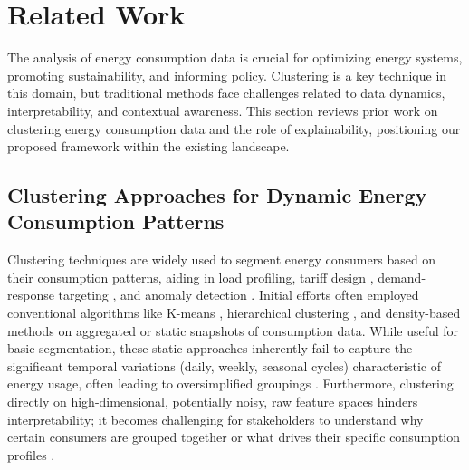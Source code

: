 \documentclass[final,authoryear,3p,times,review,sort&compress]{elsarticle}
\begin{document}
\section{Related Work}
\label{sec:related_work}

The analysis of energy consumption data is crucial for optimizing energy systems, promoting sustainability, and informing policy. Clustering is a key technique in this domain, but traditional methods face challenges related to data dynamics, interpretability, and contextual awareness. This section reviews prior work on clustering energy consumption data and the role of explainability, positioning our proposed framework within the existing landscape.

\subsection{Clustering Approaches for Dynamic Energy Consumption Patterns}
Clustering techniques are widely used to segment energy consumers based on their consumption patterns, aiding in load profiling, tariff design \citep{mileta2011electricity}, demand-response targeting \citep{pelekis2023targeted}, and anomaly detection \citep{kloska2023expert}. Initial efforts often employed conventional algorithms like K-means \citep{ruiz2020time, michalakopoulos2024machine}, hierarchical clustering \citep{almahamid2022agglomerative}, and density-based methods \citep{aurangzeb2024dbscan} on aggregated or static snapshots of consumption data. While useful for basic segmentation, these static approaches inherently fail to capture the significant temporal variations (daily, weekly, seasonal cycles) characteristic of energy usage, often leading to oversimplified groupings \citep{melo2023review}. Furthermore, clustering directly on high-dimensional, potentially noisy, raw feature spaces hinders interpretability; it becomes challenging for stakeholders to understand why certain consumers are grouped together or what drives their specific consumption profiles \citep{jones2025intersectionality}.
\end{document}
